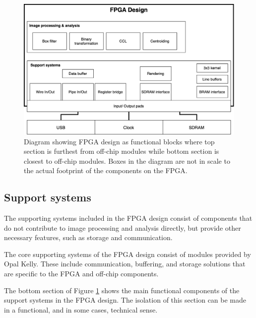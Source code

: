 \documentclass[12pt]{report}
\begin{document}
\begin{figure}[h]
    \centering
    \includegraphics[scale=0.25]{figures/fpga_design.png}
    \caption{Diagram showing FPGA design as functional blocks where top section is furthest from off-chip modules while bottom section is closest to off-chip modules. Boxes in the diagram are not in scale to the actual footprint of the components on the FPGA.}
    \label{fig:fpga_design}
\end{figure}

\subsection{Support systems}
The supporting systems included in the FPGA design consist of components that do not contribute to image processing and analysis directly, but provide other necessary features, such as storage and communication. 
\par
The core supporting systems of the FPGA design consist of modules provided by Opal Kelly. These include communication, buffering, and storage solutions that are specific to the FPGA and off-chip components. \citep{stpp}
\par
The bottom section of Figure \ref*{fig:fpga_design} shows the main functional components of the support systems in the FPGA design. The isolation of this section can be made in a functional, and in some cases, technical sense.
\end{document}
